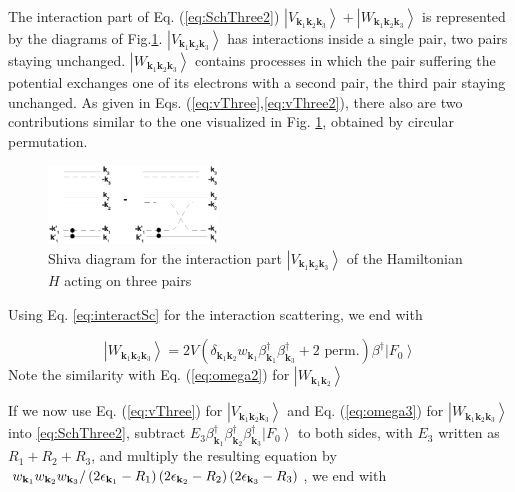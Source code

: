 \documentclass[aps,prb,superscriptaddress,showpacs,reprint,lengthcheck]{revtex4-1}
\begin{document}
The interaction part of Eq. (\ref{eq:SchThree2}) $\left|V_{\mathbf{k} _1\mathbf{k} _2%
\mathbf{k} _3}\right>+\left|W_{\mathbf{k} _1\mathbf{k} _2\mathbf{k} _3}\right> $ is represented by the diagrams of Fig.\ref{fig:threeP}. $\left|V_{\mathbf{k} _1\mathbf{k} _2
\mathbf{k} _3}\right>$ has interactions inside a single pair, two pairs
staying unchanged. $\left|W_{\mathbf{k} _1\mathbf{k} _2\mathbf{k} _3}\right> $ contains processes in which the pair suffering the potential exchanges one of its electrons with a second pair, the third pair staying unchanged.  \normalsize	As given in Eqs. (\ref{eq:vThree},\ref{eq:vThree2}), there also are two  contributions similar to the one
visualized in Fig. \ref{fig:threeP}, obtained by circular permutation.
\begin{figure}[htb]
   \includegraphics[width=0.4\textwidth]{threePair.eps}
\caption{Shiva diagram for the interaction part $\left|V_{\mathbf{k} _1\mathbf{k} _2%
\mathbf{k} _3}\right> $ of the Hamiltonian $H$ acting on three pairs }\label{fig:threeP}
 \end{figure}

Using Eq. \eqref{eq:interactSc} for the interaction scattering, we end with

\begin{equation}\label{eq:omega3}
\left|W_{\mathbf{k} _1\mathbf{k} _2\mathbf{k} _3}\right>= 2V(\delta_{\mathbf{k} _1\mathbf{k} _2}w_{\mathbf{k} _1}\beta^{\dagger}_{\mathbf{k} _1}\beta^{\dagger}_{\mathbf{k} _3}+ \text{2 perm.})\beta^{\dagger}\left|F_0\right>
\end{equation}
Note the similarity with Eq. (\ref{eq:omega2}) for $\left|W_{\mathbf{k} _1\mathbf{k} _2}\right> $



If we now use Eq. (\ref{eq:vThree}) for $\left|V_{\mathbf{k} _1\mathbf{k} _2\mathbf{k} _3}\right>$  and Eq. (\ref{eq:omega3}) for $\left|W_{\mathbf{k} _1\mathbf{k} _2\mathbf{k} _3}\right> $ into \eqref{eq:SchThree2}, subtract $E
_3\beta^{\dagger}_{\mathbf{k} _1}\beta^{\dagger}_{\mathbf{k}
_2}\beta^{\dagger}_{\mathbf{k} _3}\left|F_0\right>  $ to both sides, with $%
E _3$ written as $R_1+R_2+R_3$, and multiply the resulting equation
by $w_{\mathbf{k} _1}w_{\mathbf{k} _2}w_{\mathbf{k} _3}/\left(2\epsilon_{%
\mathbf{k} _1}-R_1\right) \left(2\epsilon_{\mathbf{k} _2}-R_2\right)
\left(2\epsilon_{\mathbf{k} _3}-R_3\right) $, we end with
\end{document}
